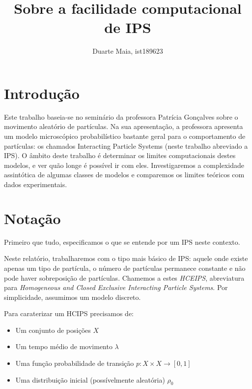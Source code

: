 \documentclass{article}
\title{Sobre a facilidade computacional de IPS}
\author{Duarte Maia, ist189623}
\date{}
\begin{document}
	\maketitle
	
	\tableofcontents

	\section{Introdução}

	Este trabalho baseia-se no seminário da professora Patrícia Gonçalves sobre o movimento aleatório de partículas.
	Na sua apresentação, a professora apresenta um modelo microscópico probabilístico bastante geral para o comportamento de partículas: os chamados Interacting Particle Systems (neste trabalho abreviado a IPS). O âmbito deste trabalho é determinar os limites computacionais destes modelos, e ver quão longe é possível ir com eles. Investigaremos a complexidade assintótica de algumas classes de modelos e comparemos os limites teóricos com dados experimentais.

	\section{Notação}

	Primeiro que tudo, especificamos o que se entende por um IPS neste contexto.
	
	Neste relatório, trabalharemos com o tipo mais básico de IPS: aquele onde existe apenas um tipo de partícula, o número de partículas permanece constante e não pode haver sobreposição de partículas. Chamemos a estes \emph{HCEIPS}, abreviatura para \emph{Homogeneous and Closed Exclusive Interacting Particle Systems}. Por simplicidade, assumimos um modelo discreto.
	
	Para caraterizar um HCIPS precisamos de:
	
	\begin{itemize}
	\item Um conjunto de posições $X$
	
	\item Um tempo médio de movimento $\lambda$
	
	\item Uma função probabilidade de transição $p : X \times X \rightarrow [0,1]$
	
	\item Uma distribuição inicial (possívelmente aleatória) $\rho_0$
	\end{itemize}
	
\end{document}
